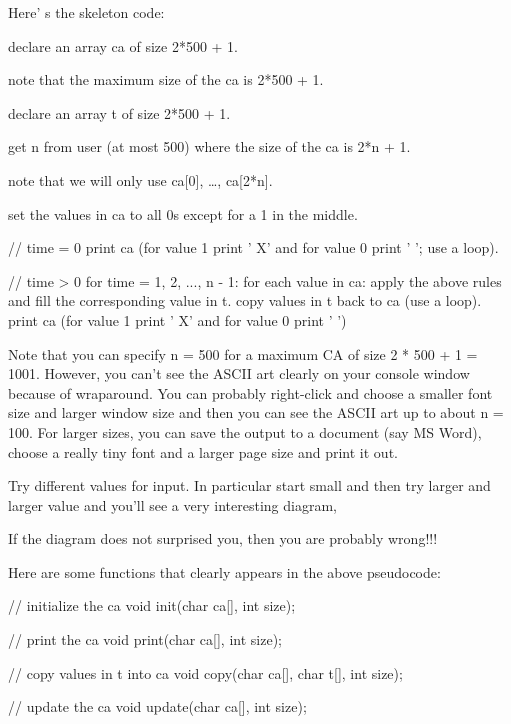 Here' s the skeleton code:

\begin{consolethree}[escapeinside=||]
declare an array ca of size 2*500 + 1.

note that the maximum size of the ca is 2*500 + 1.

declare an array t of size 2*500 + 1.

get n from user (at most 500) where the size of the ca is 2*n + 1.

note that we will only use ca[0], \ldots, ca[2*n].

set the values in ca to all 0s except for a 1 in the middle.

// time = 0
print ca (for value 1 print ' X' and for value 0 print ' '; use a loop).

// time > 0
for time = 1, 2, ..., n - 1:
{
    for each value in ca:
    {
        apply the above rules and fill the corresponding value in t.
        copy values in t back to ca (use a loop).
        print ca (for value 1 print ' X' and for value 0 print ' ')
    }
}
\end{consolethree}

Note that you can specify n = 500 for a maximum CA of size 2 * 500 + 1 = 1001. However, you can't see the ASCII art clearly on your console window because of wraparound. You can probably right-click and choose a smaller font size and larger window size and then you can see the ASCII art up to about n = 100. For larger sizes, you can save the output to a document (say MS Word), choose a really tiny font and a larger page size and print it out.

Try different values for input. In particular start small and then try larger and larger value and you'll see a very interesting diagram,

If the diagram does not surprised you, then you are probably wrong!!!

Here are some functions that clearly appears in the above pseudocode:

\begin{consolethree}[escapeinside=||]
// initialize the ca
void init(char ca[], int size);

// print the ca
void print(char ca[], int size);

// copy values in t into ca
void copy(char ca[], char t[], int size);

// update the ca
void update(char ca[], int size);
\end{consolethree}

